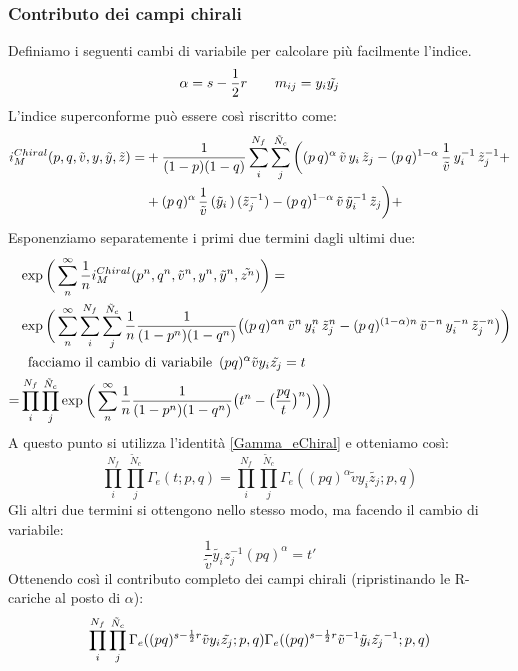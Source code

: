 \documentclass[a4paper,12pt]{report}
\begin{document}
\subsubsection{Contributo dei campi chirali}
Definiamo i seguenti cambi di variabile per calcolare più facilmente l'indice.
$$
	\alpha = s - {1 \over 2 } r  \qquad m_{ij} = y_i \tilde{y_j}
$$
	L'indice superconforme può essere così riscritto come:
\begin{align*}
 i_M^{Chiral}  (p,q, \tilde v, y,\tilde y ,\tilde z) = &
 +{1\over (1-p)(1-q)} \sum_i^{N_f}\sum_j^{\tilde N_c} \bigg( (p\,q)^{\alpha} \,\tilde v \, y_i\, \tilde z_j
- (p\,q)^{1- \alpha} \, {1 \over \tilde v}\, y_i^{-1} \,   
\tilde z_j^{-1} + \\
& + (p\,q)^{\alpha}\, {1\over \tilde v}\, 
({\tilde y_i}\,) \,  
(\tilde z_j^{-1})
- (p\,q)^{1- \alpha} \, \tilde v \, 
{\tilde y_i}^{-1} \, 
\tilde z_j \bigg) + \\
\end{align*}
Esponenziamo separatemente i primi due termini dagli ultimi due:
\begin{align*} 
&\exp \bigg( \sum_{n}^{\infty} \frac{1}{n} i_M^{Chiral} (p^n,q^n, \tilde v^n, y^n,\tilde y^n ,\tilde{z^n} ) \bigg)  = \\
& \exp \bigg( \sum_{n}^{\infty} \sum_i^{N_f}\sum_j^{\tilde N_c}  \frac{1}{n}    {1\over (1-p^n)(1-q^n)} \big( (p \, q)^{\alpha n} \,\tilde v^n \, y_i^n\, \tilde z_j^n
- (p\,q)^{(1- \alpha)n} \, \tilde v^{-n}\, y_i^{-n} \,   
\tilde z_j^{-n} \big) \bigg) \\
& \; \mbox{ facciamo il cambio di variabile } \, (pq)^{\alpha} \tilde{v} y_i \tilde{z_j} = t \\
=& \prod_i^{N_f}\prod_j^{\tilde N_c}  \exp \bigg( \sum_{n}^{\infty} \frac{1}{n}   {1\over (1-p^n)(1-q^n)} \big( t^n - \big( \frac{pq}{t} \big)^n \big) \bigg) \bigg)
\end{align*}
A questo punto si utilizza l'identità \ref{Gamma_eChiral} e otteniamo così:
\begin{equation}
	\prod_i^{N_f}\prod_j^{\tilde N_c} \Gamma_e ( t ; p,q) = \prod_i^{N_f}\prod_j^{\tilde N_c} \Gamma_e ( (pq)^{\alpha} \tilde{v} y_i \tilde{z_j} ; p,q)
\end{equation}
Gli altri due termini si ottengono nello stesso modo, ma facendo il cambio di variabile:
$$
	\frac{1}{\tilde v } \tilde{y_i} z_j^{-1} (pq)^{\alpha} = t'
$$
Ottenendo così il contributo completo dei campi chirali (ripristinando le R-cariche al posto di $\alpha$):
\begin{equation}
\prod_i^{N_f}\prod_j^{\tilde N_c} \Gamma_e ( (pq)^{s - {1 \over 2 } r} \tilde{v} y_i \tilde{z_j} ; p,q)\Gamma_e ( (pq)^{s - {1 \over 2 } r} \tilde{v}^{-1} \tilde y_i \tilde{z_j}^{-1} ; p,q)
\end{equation}
\end{document}
